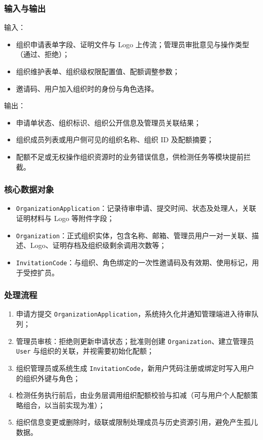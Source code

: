 \subsubsection{输入与输出}
输入：
\begin{itemize}[leftmargin=2em]
    \item 组织申请表单字段、证明文件与 Logo 上传流；管理员审批意见与操作类型（通过、拒绝）；
    \item 组织维护表单、组织级权限配置值、配额调整参数；
    \item 邀请码、用户加入组织时的身份与角色选择。
\end{itemize}

输出：
\begin{itemize}[leftmargin=2em]
    \item 申请单状态、组织标识、组织公开信息及管理员关联结果；
    \item 组织成员列表或用户侧可见的组织名称、组织 ID 及配额摘要；
    \item 配额不足或无权操作组织资源时的业务错误信息，供检测任务等模块提前拦截。
\end{itemize}

\subsubsection{核心数据对象}
\begin{itemize}[leftmargin=2em]
    \item \texttt{OrganizationApplication}：记录待审申请、提交时间、状态及处理人，关联证明材料与 Logo 等附件字段；
    \item \texttt{Organization}：正式组织实体，包含名称、邮箱、管理员用户一对一关联、描述、Logo、证明存档及组织级剩余调用次数等；
    \item \texttt{InvitationCode}：与组织、角色绑定的一次性邀请码及有效期、使用标记，用于受控扩员。
\end{itemize}

\subsubsection{处理流程}
\begin{enumerate}[leftmargin=2em]
    \item 申请方提交 \texttt{OrganizationApplication}，系统持久化并通知管理端进入待审队列；
    \item 管理员审核：拒绝则更新申请状态；批准则创建 \texttt{Organization}、建立管理员 \texttt{User} 与组织的关联，并视需要初始化配额；
    \item 组织管理员或系统生成 \texttt{InvitationCode}，新用户凭码注册或绑定时写入用户的组织外键与角色；
    \item 检测任务执行前后，由业务层调用组织配额校验与扣减（可与用户个人配额策略组合，以当前实现为准）；
    \item 组织信息变更或删除时，级联或限制处理成员与历史资源引用，避免产生孤儿数据。
\end{enumerate}

